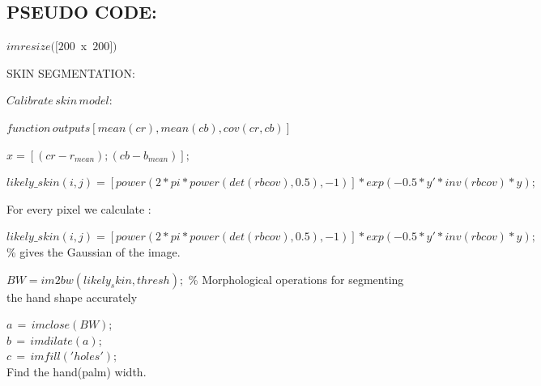 \documentclass[conference]{IEEEtran}
\begin{document}
\subsection{PSEUDO CODE:}
\begin{flushleft}
$imresize([200 \, $ x $ \, 200])$ 

SKIN SEGMENTATION:

$Calibrate \, skin \, model : $

$function \, outputs[ mean(cr) ,mean(cb), cov(cr,cb)]$

$x = [(cr-r_{mean});(cb-b_{mean})];$

$likely\_skin(i,j) = [power(2*pi*power(det(rbcov),0.5),-1)]*exp(-0.5* y'*inv(rbcov)* y);$

For every pixel we calculate :

$likely\_skin(i,j) = [power(2*pi*power(det(rbcov),0.5),-1)]*exp(-0.5*y'*inv(rbcov)*y);$ \% gives the Gaussian of the image. 

$BW = im2bw(likely_skin,thresh); $ \% Morphological operations for segmenting the hand shape accurately

$a \, =\, imclose(BW)$;\\
$b \, =\, imdilate(a)$;\\
$c \,=\, imfill('holes');$\\

Find the hand(palm) width. 
\end{flushleft}
\end{document}
